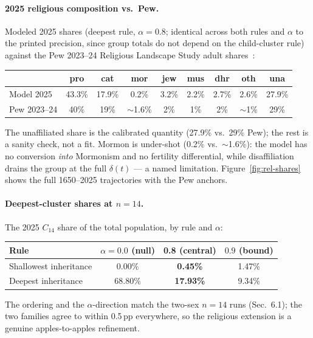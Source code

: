 \documentclass[11pt,a4paper]{article}
\begin{document}
\paragraph{2025 religious composition vs.\ Pew.}  Modeled 2025 shares
(deepest rule, $\alpha=0.8$; identical across both rules and $\alpha$ to the
printed precision, since group totals do not depend on the child-cluster
rule) against the Pew 2023--24 Religious Landscape Study adult
shares~\cite{pew-rls-2025}:

\begin{center}
\small
\begin{tabular}{@{}lcccccccc@{}}
\toprule
 & pro & cat & mor & jew & mus & dhr & oth & una \\
\midrule
Model 2025 & 43.3\% & 17.9\% & 0.2\% & 3.2\% & 2.2\% & 2.7\% & 2.6\% & 27.9\% \\
Pew 2023--24 & 40\% & 19\% & $\sim$1.6\% & 2\% & 1\% & 2\% & $\sim$1\% & 29\% \\
\bottomrule
\end{tabular}
\end{center}
The unaffiliated share is the calibrated quantity (27.9\% vs.\ 29\% Pew);
the rest is a sanity check, not a fit.  Mormon is under-shot (0.2\% vs.\
$\sim$1.6\%): the model has no conversion \emph{into} Mormonism and no
fertility differential, while disaffiliation drains the group at the full
$\delta(t)$ --- a named limitation.  Figure~\ref{fig:rel-shares} shows
the full 1650--2025 trajectories with the Pew anchors.

\paragraph{Deepest-cluster shares at $n=14$.}  The 2025 $C_{14}$ share of the
total population, by rule and $\alpha$:

\begin{center}
\small
\begin{tabular}{@{}lccc@{}}
\toprule
Rule & $\alpha{=}0.0$ (null) & \textbf{0.8} (central) & $0.9$ (bound) \\
\midrule
Shallowest inheritance & 0.00\% & \textbf{0.45\%} & 1.47\% \\
Deepest inheritance & 68.80\% & \textbf{17.93\%} & 9.34\% \\
\bottomrule
\end{tabular}
\end{center}
The ordering and the $\alpha$-direction match the two-sex $n=14$ runs
(Sec.~6.1); the two families agree to within 0.5\,pp everywhere, so the
religious extension is a genuine apples-to-apples refinement.
\end{document}
